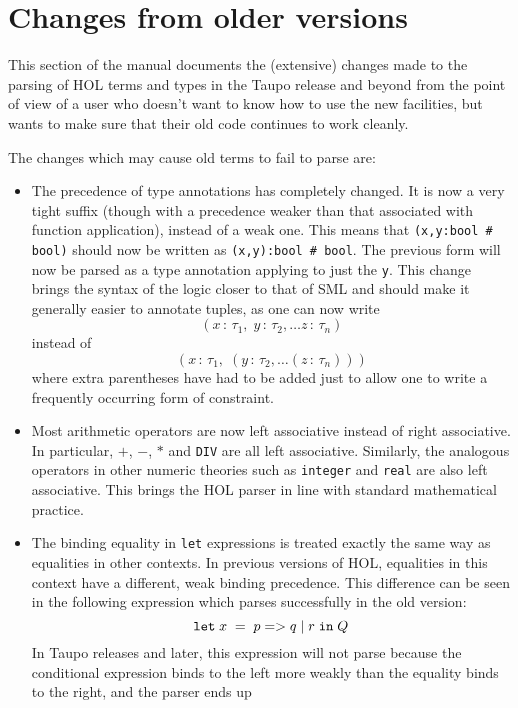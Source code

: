 {\section{Changes from older versions}

This section of the manual documents the (extensive) changes made to
the parsing of HOL terms and types in the Taupo release and beyond
from the point of view of a user who doesn't want to know how to use
the new facilities, but wants to make sure that their old code
continues to work cleanly.

The changes which may cause old terms to fail to parse are:
\begin{itemize}
\newcommand\condexp{\mbox{$p \; {\tt =>} \; q \; {\tt |} \; r$}}
\item The precedence of type annotations has completely changed.  It
  is now a very tight suffix (though with a precedence weaker than
  that associated with function application), instead of a weak one.
  This means that \mbox{\tt (x,y:bool \# bool)} should now be written
  as \mbox{\tt (x,y):bool \# bool}. The previous form will now be
  parsed as a type annotation applying to just the \verb+y+.  This
  change brings the syntax of the logic closer to that of SML and
  should make it generally easier to annotate tuples, as one can now
  write \[ (x\,:\,\tau_1,\;y\,:\,\tau_2,\dots z\,:\,\tau_n)
  \] instead of \[
  (x\,:\,\tau_1, \;(y\,:\,\tau_2, \dots (z\,:\,\tau_n)))
  \] where extra parentheses have had to be added just to allow one to
  write a frequently occurring form of constraint.
\item Most arithmetic operators are now left associative instead of
  right associative.  In particular, $+$, $-$, $*$ and {\tt DIV} are
  all left associative.  Similarly, the analogous operators in other
  numeric theories such as {\tt integer} and {\tt real} are also left
  associative.  This brings the HOL parser in line with standard
  mathematical practice.
\item The binding equality in {\tt let} expressions is treated exactly
  the same way as equalities in other contexts.  In previous versions
  of HOL, equalities in this context have a different, weak binding
  precedence.  This difference can be seen in the following expression
  which parses successfully in the old version:
  \[ {\tt let} \; x \; = \; \condexp \; {\tt
  in} \;Q \] In Taupo releases and later, this expression will not
  parse because the conditional expression binds to the left more
  weakly than the equality binds to the right, and the parser ends up

\end{itemize}}
